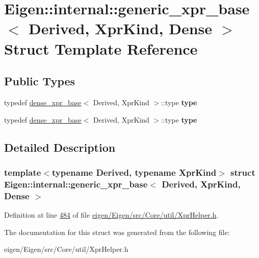 \hypertarget{struct_eigen_1_1internal_1_1generic__xpr__base_3_01_derived_00_01_xpr_kind_00_01_dense_01_4}{}\section{Eigen\+:\+:internal\+:\+:generic\+\_\+xpr\+\_\+base$<$ Derived, Xpr\+Kind, Dense $>$ Struct Template Reference}
\label{struct_eigen_1_1internal_1_1generic__xpr__base_3_01_derived_00_01_xpr_kind_00_01_dense_01_4}
\subsection*{Public Types}
\begin{DoxyCompactItemize}
\item 
\mbox{\label{struct_eigen_1_1internal_1_1generic__xpr__base_3_01_derived_00_01_xpr_kind_00_01_dense_01_4_a4ed1633e4600ed266bb514233743d66e}} 
typedef \hyperlink{struct_eigen_1_1internal_1_1dense__xpr__base}{dense\+\_\+xpr\+\_\+base}$<$ Derived, Xpr\+Kind $>$\+::type {\bfseries type}
\item 
\mbox{\label{struct_eigen_1_1internal_1_1generic__xpr__base_3_01_derived_00_01_xpr_kind_00_01_dense_01_4_a4ed1633e4600ed266bb514233743d66e}} 
typedef \hyperlink{struct_eigen_1_1internal_1_1dense__xpr__base}{dense\+\_\+xpr\+\_\+base}$<$ Derived, Xpr\+Kind $>$\+::type {\bfseries type}
\end{DoxyCompactItemize}


\subsection{Detailed Description}
\subsubsection*{template$<$typename Derived, typename Xpr\+Kind$>$\newline
struct Eigen\+::internal\+::generic\+\_\+xpr\+\_\+base$<$ Derived, Xpr\+Kind, Dense $>$}



Definition at line \hyperlink{eigen_2_eigen_2src_2_core_2util_2_xpr_helper_8h_source_l00484}{484} of file \hyperlink{eigen_2_eigen_2src_2_core_2util_2_xpr_helper_8h_source}{eigen/\+Eigen/src/\+Core/util/\+Xpr\+Helper.\+h}.



The documentation for this struct was generated from the following file\+:\begin{DoxyCompactItemize}
\item 
eigen/\+Eigen/src/\+Core/util/\+Xpr\+Helper.\+h\end{DoxyCompactItemize}
